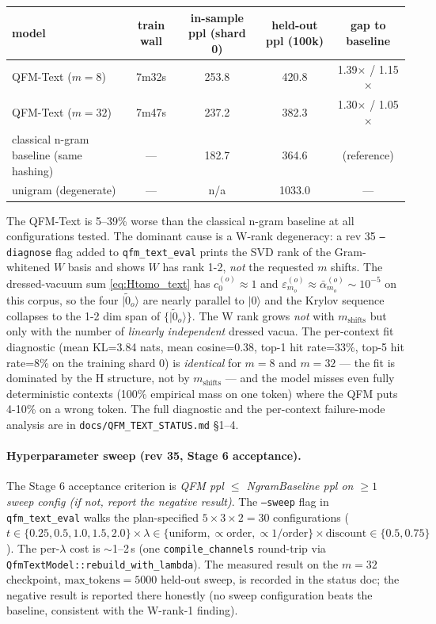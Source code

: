 \documentclass[11pt, a4paper]{article}
\begin{document}
\begin{tabular}{@{}lcccc@{}}
\hline
model & train wall & in-sample ppl (shard 0) & held-out ppl (100k) & gap to baseline \\
\hline
QFM-Text ($m=8$)  & 7m32s & 253.8 & 420.8 & 1.39$\times$ / 1.15$\times$ \\
QFM-Text ($m=32$) & 7m47s & 237.2 & 382.3 & 1.30$\times$ / 1.05$\times$ \\
classical n-gram baseline (same hashing) & --- & 182.7 & 364.6 & (reference) \\
unigram (degenerate) & --- & n/a & 1033.0 & --- \\
\hline
\end{tabular}

The QFM-Text is 5--39\% worse than the classical n-gram baseline at
all configurations tested. The dominant cause is a W-rank
degeneracy: a rev 35 \texttt{--diagnose} flag added to
\texttt{qfm\_text\_eval} prints the SVD rank of the
Gram-whitened $W$ basis and shows $W$ has rank 1-2, \emph{not}
the requested $m$ shifts. The dressed-vacuum sum
\eqref{eq:Htomo_text} has $c_0^{(o)}\approx1$ and
$\varepsilon_{m_o}^{(o)}\approx\bar\alpha_{m_o}^{(o)}\sim10^{-5}$
on this corpus, so the four $|\tilde 0_o\rangle$ are nearly
parallel to $|0\rangle$ and the Krylov sequence collapses to the
1-2 dim span of $\{|\tilde 0_o\rangle\}$. The W rank grows
\emph{not} with $m_\mathrm{shifts}$ but only with the number of
\emph{linearly independent} dressed vacua. The per-context fit
diagnostic (mean KL=3.84 nats, mean cosine=0.38, top-1 hit
rate=33\%, top-5 hit rate=8\% on the training shard 0) is
\emph{identical} for $m=8$ and $m=32$ --- the fit is dominated by
the H structure, not by $m_\mathrm{shifts}$ --- and the model
misses even fully deterministic contexts (100\% empirical mass on
one token) where the QFM puts 4-10\% on a wrong token. The full
diagnostic and the per-context failure-mode analysis are in
\texttt{docs/QFM\_TEXT\_STATUS.md} §1--4.

\paragraph{Hyperparameter sweep (rev 35, Stage 6 acceptance).}
The Stage 6 acceptance criterion is \emph{QFM ppl $\le$ NgramBaseline
ppl on $\ge 1$ sweep config (if not, report the negative result)}.
The \texttt{--sweep} flag in \texttt{qfm\_text\_eval} walks the
plan-specified $5\times 3\times 2 = 30$ configurations
($t\in\{0.25,0.5,1.0,1.5,2.0\}\times\lambda\in\{\mathrm{uniform},
\propto\mathrm{order},\propto1/\mathrm{order}\}\times
\mathrm{discount}\in\{0.5,0.75\}$). The per-$\lambda$ cost is
$\sim$1--2\,s (one \texttt{compile\_channels} round-trip via
\texttt{QfmTextModel::rebuild\_with\_lambda}). The measured result
on the $m=32$ checkpoint, $\mathrm{max\_tokens}=5000$ held-out
sweep, is recorded in the status doc; the negative result is
reported there honestly (no sweep configuration beats the
baseline, consistent with the W-rank-1 finding).
\end{document}
